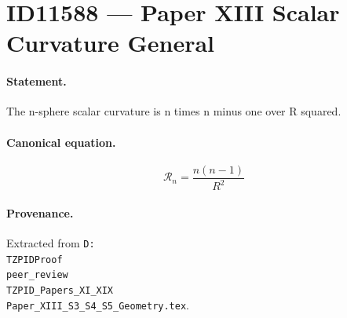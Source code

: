 \section*{ID11588 --- Paper XIII Scalar Curvature General}

\paragraph{Statement.}
The n-sphere scalar curvature is n times n minus one over R squared.

\paragraph{Canonical equation.}
\[
\mathcal{R}_n=\frac{n(n-1)}{R^2}
\]

\paragraph{Provenance.}
Extracted from \texttt{D:\\TZPIDProof\\peer\_review\\TZPID\_Papers\_XI\_XIX\\Paper\_XIII\_S3\_S4\_S5\_Geometry.tex}.
